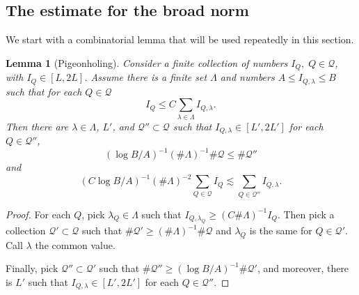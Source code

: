 \documentclass{amsart}%
\numberwithin{equation}{section}
\newtheorem{lemma}[theorem]{Lemma}
\newcommand{\1}{\mathbbm{1}}
\begin{document}
\smallskip

\subsection{The estimate for the broad norm}
We start with a combinatorial lemma that will be used repeatedly in this section.
\begin{lemma}[Pigeonholing]
\label{lcomb}Consider a finite collection of numbers $I_Q,\;Q\in\mathcal Q$, with $I_Q\in [L,2L]$. Assume there is a finite set $\Lambda$ and numbers $A\le I_{Q,\lambda}\le B$ such that for each $Q\in\mathcal Q$
$$I_Q\le C\sum_{\lambda\in\Lambda}I_{Q,\lambda}.$$
Then there are $\lambda\in\Lambda$, $L'$, and $\mathcal Q''\subset \mathcal Q$ such that $I_{Q,\lambda}\in [L',2L']$ for each $Q\in\mathcal Q''$,
$$ (\log B/A)^{-1}(\#\Lambda)^{-1}\#\mathcal Q\le\#\mathcal Q'' $$ and
$$(C\log B/A)^{-1}(\#\Lambda)^{-2}\sum_{Q\in \mathcal Q}I_Q\lesssim \sum_{Q\in\mathcal Q''}I_{Q,\lambda}.$$
\end{lemma}
\begin{proof}
For each $Q$, pick $\lambda_Q\in\Lambda$ such that $I_{Q,\lambda_Q}\ge (C\# \Lambda)^{-1}I_Q.$ Then pick a collection $\mathcal Q'\subset\mathcal Q$ such that $\#\mathcal Q'\ge (\#\Lambda)^{-1}\#\mathcal Q$ and $\lambda_Q$ is the same for $Q\in\mathcal Q'$. Call $\lambda$ the common value. 

Finally, pick $\mathcal Q''\subset \mathcal Q'$ such that $\#\mathcal Q''\ge (\log B/A)^{-1}\#\mathcal Q'$, and moreover, there is $L'$ such that  $I_{Q,\lambda}\in [L',2L']$ for each $Q\in\mathcal Q''$.
\qedhere
\end{proof}

\medskip
\end{document}
